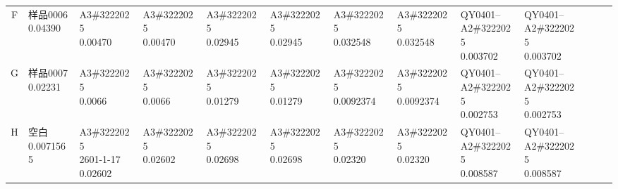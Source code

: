 \documentclass[UTF8,10pt,a4paper,fontset=fandol]{ctexart}
\begin{document}
\begin{center}
\begin{tabular}{c|*{12}{p{0.55cm}|}}
 &
 &
\\ \hline
F &
\shortstack{样品0006\\0.04390} &
\shortstack{A3\#3222025\\0.00470} &
\shortstack{A3\#3222025\\0.00470} &
\shortstack{A3\#3222025\\0.02945} &
\shortstack{A3\#3222025\\0.02945} &
\shortstack{A3\#3222025\\0.032548} &
\shortstack{A3\#3222025\\0.032548} &
\shortstack{QY0401--\\A2\#3222025\\0.003702} &
\shortstack{QY0401--\\A2\#3222025\\0.003702} &
 &
 &
\\ \hline
G &
\shortstack{样品0007\\0.02231} &
\shortstack{A3\#3222025\\0.0066} &
\shortstack{A3\#3222025\\0.0066} &
\shortstack{A3\#3222025\\0.01279} &
\shortstack{A3\#3222025\\0.01279} &
\shortstack{A3\#3222025\\0.0092374} &
\shortstack{A3\#3222025\\0.0092374} &
\shortstack{QY0401--\\A2\#3222025\\0.002753} &
\shortstack{QY0401--\\A2\#3222025\\0.002753} &
 &
 &
\\ \hline
H &
\shortstack{空白\\0.0071565} &
\shortstack{A3\#3222025\\2601-1-17\\0.02602} &
\shortstack{A3\#3222025\\0.02602} &
\shortstack{A3\#3222025\\0.02698} &
\shortstack{A3\#3222025\\0.02698} &
\shortstack{A3\#3222025\\0.02320} &
\shortstack{A3\#3222025\\0.02320} &
\shortstack{QY0401--\\A2\#3222025\\0.008587} &
\shortstack{QY0401--\\A2\#3222025\\0.008587} &
 &
 &
\\ \hline
\end{tabular}
\end{center}
\end{document}
